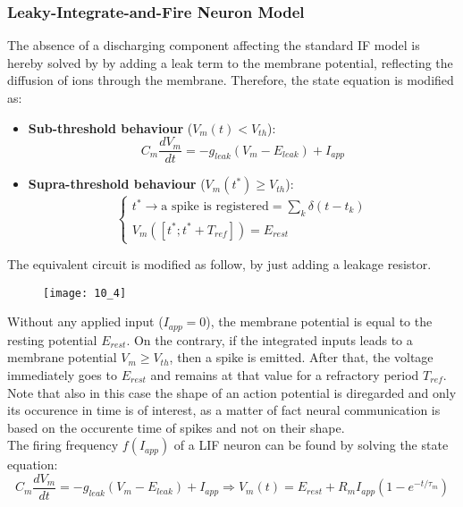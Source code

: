 \subsubsection{Leaky-Integrate-and-Fire Neuron Model}
The absence of a discharging component affecting the standard IF model is hereby solved by by adding a leak term
to the membrane potential, reflecting the diffusion of ions through the membrane. Therefore, the state equation
is modified as:
\begin{itemize}
    \item \textbf{Sub-threshold behaviour} (\(V_{m}(t)<V_{th}\)):
          \begin{equation*}
              C_{m}\frac{dV_{m}}{dt}=-g_{leak}(V_{m}-E_{leak})+I_{app}
          \end{equation*}
    \item \textbf{Supra-threshold behaviour} (\(V_{m}(t^{*})\ge{V_{th}}\)):
          \begin{equation*}
              \begin{cases}
                  t^{*}\rightarrow{\text{a spike is registered}}=\sum_{k}\delta{(t-t_{k})} \\
                  V_{m}([t^{*};t^{*}+T_{ref}])=E_{rest}
              \end{cases}
          \end{equation*}
\end{itemize}
The equivalent circuit is modified as follow, by just adding a leakage resistor.
\begin{figure}[H]
    \texttt{[image: 10\_4]}
    \centering
\end{figure}
Without any applied input (\(I_{app}=0\)), the membrane potential is equal to the resting potential \(E_{rest}\).
On the contrary, if the integrated inputs leads to a membrane potential \(V_{m}\ge{V_{th}}\), then a spike is emitted.
After that, the voltage immediately goes to \(E_{rest}\) and remains at that value for a refractory period \(T_{ref}\).\\
Note that also in this case the shape of an action potential is diregarded and only its occurence in time is of interest,
as a matter of fact neural communication is based on the occurente time of spikes and not on their shape.\\
The firing frequency \(f(I_{app})\) of a LIF neuron can be found by solving the state equation:
\begin{equation*}
    C_{m}\frac{dV_{m}}{dt}=-g_{leak}(V_{m}-E_{leak})+I_{app}
    \Rightarrow
    V_{m}(t)=E_{rest}+R_{m}I_{app}(1-e^{-t/\tau_{m}})
\end{equation*}
